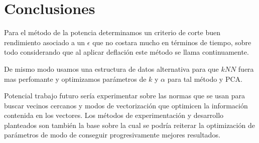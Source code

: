 \section{Conclusiones}%

Para el método de la potencia determinamos un criterio de corte buen rendimiento asociado a un $\epsilon$ que no costara mucho en términos de tiempo, sobre todo considerando que al aplicar deflación este método se llama continuamente.

De mismo modo usamos una estructura de datos alternativa para que $kNN$ fuera mas perfomante y optimizamos parámetros de $k$ y $\alpha$ para tal método y PCA.

Potencial trabajo futuro sería experimentar sobre las normas que se usan para buscar vecinos cercanos y modos de vectorización que optimicen la información contenida en los vectores. Los métodos de experimentación y desarrollo planteados son también la base sobre la cual se podría reiterar la optimización de parámetros de modo de conseguir progresivamente mejores resultados.
\label{sec:conclusiones}
